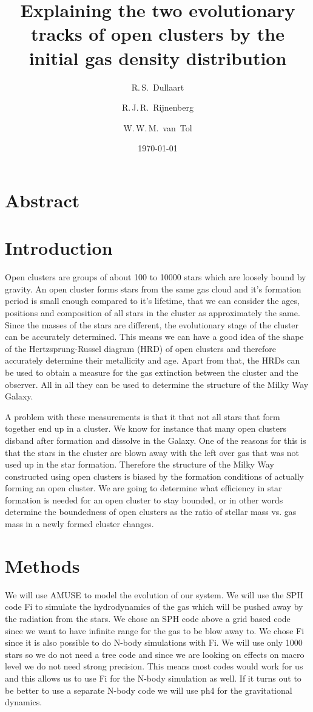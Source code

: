 \documentclass[12pt]{article}
\title{Explaining the two evolutionary tracks of open clusters by the initial gas density distribution} \author{R.\,S.~Dullaart \and R.\,J.\,R.~Rijnenberg \and W.\,W.\,M.~van~Tol} \date{\today}
\begin{document}
 \maketitle

\section*{Abstract}


\section{Introduction}
Open clusters are groups of about 100 to \num{10000} stars which are loosely bound by gravity.
An open cluster forms stars from the same gas cloud and it's formation period is small enough compared to it's lifetime, that we can consider the ages, positions and composition of all stars in the cluster as approximately the same.
Since the masses of the stars are different, the evolutionary stage of the cluster can be accurately determined.
This means we can have a good idea of the shape of the Hertzsprung-Russel diagram (HRD) of open clusters and therefore accurately determine their metallicity and age.
Apart from that, the HRDs can be used to obtain a measure for the gas extinction between the cluster and the observer.
All in all they can be used to determine the structure of the Milky Way Galaxy.

A problem with these measurements is that it that not all stars that form together end up in a cluster.
We know for instance that many open clusters disband after formation and dissolve in the Galaxy.
One of the reasons for this is that the stars in the cluster are blown away with the left over gas that was not used up in the star formation.
Therefore the structure of the Milky Way constructed using open clusters is biased by the formation conditions of actually forming an open cluster.
We are going to determine what efficiency in star formation is needed for an open cluster to stay bounded, or in other words determine the boundedness of open clusters as the ratio of stellar mass vs. gas mass in a newly formed cluster changes.




\section{Methods}
We will use AMUSE to model the evolution of our system. We will use the SPH code Fi to simulate the hydrodynamics of the gas which will be pushed away by the radiation from the stars. We chose an SPH code above a grid based code since we want to have infinite range for the gas to be blow away to. We chose Fi since it is also possible to do N-body simulations with Fi. We will use only 1000 stars so we do not need a tree code and since we are looking on effects on macro level we do not need strong precision. This means most codes would work for us and this allows us to use Fi for the N-body simulation as well. If it turns out to be better to use a separate N-body code we will use ph4 for the gravitational dynamics. 
\end{document}

